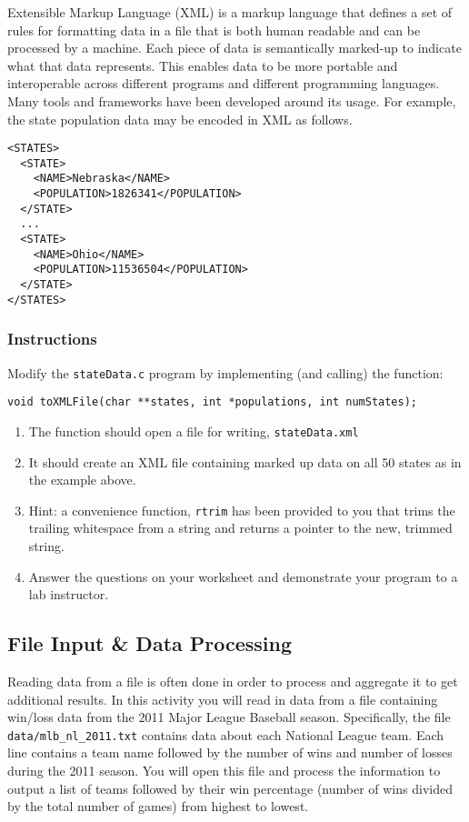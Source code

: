 \documentclass[12pt]{scrartcl}
\begin{document}
Extensible Markup Language (XML) is a markup language that defines a set 
of rules for formatting data in a file that is both human readable and can be 
processed by a machine.  Each piece of data is semantically marked-up to 
indicate what that data represents.  This enables data to be more portable 
and interoperable across different programs and different programming 
languages.  Many tools and frameworks have been developed around its 
usage.  For example, the state population data may be encoded in XML 
as follows.

\begin{verbatim}
<STATES>
  <STATE>
    <NAME>Nebraska</NAME>
    <POPULATION>1826341</POPULATION>
  </STATE>
  ...
  <STATE>
    <NAME>Ohio</NAME>
    <POPULATION>11536504</POPULATION>
  </STATE>
</STATES>
\end{verbatim}

\subsubsection*{Instructions}

Modify the \texttt{stateData.c} program by implementing 
(and calling) the function:

\texttt{void toXMLFile(char **states, int *populations, int numStates);}

\begin{enumerate}
  \item The function should open a file for writing, \texttt{stateData.xml}
  \item It should create an XML file containing marked up data on all 50 states 
	as in the example above.  
  \item Hint: a convenience function, \texttt{rtrim} has been provided 
	to you that trims the trailing whitespace from a string and returns a pointer 
	to the new, trimmed string.
  \item Answer the questions on your worksheet and demonstrate your program 
	to a lab instructor.
\end{enumerate}
	
\subsection{File Input \& Data Processing}

Reading data from a file is often done in order to process and aggregate it to 
get additional results.  In this activity you will read in data from a file containing 
win/loss data from the 2011 Major League Baseball season.  Specifically, the 
file \texttt{data/mlb_nl_2011.txt} contains data about each National League 
team.  Each line contains a team name followed by the number of wins and 
number of losses during the 2011 season.  You will open this file and process 
the information to output a list of teams followed by their win percentage 
(number of wins divided by the total number of games) from highest to lowest.
\end{document}
